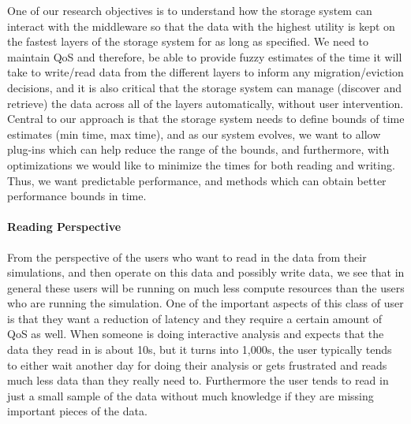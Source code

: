 One of our  research objectives is to understand how the
storage system can interact with the middleware   so
that the data with the highest utility is kept on the fastest layers of the
storage system for as long as specified. We need to maintain 
QoS and therefore, be able to provide fuzzy estimates of the time it will take to write/read data from
the different layers to inform any migration/eviction decisions, and it
is also critical that the storage system can manage (discover and retrieve) the data across all of the
layers automatically, without user intervention. 
Central to our approach is that the storage system needs to define bounds of time estimates
(min time, max time), and as our system evolves, we want to allow plug-ins which can help
reduce the range of the bounds, and furthermore, with optimizations we would like to minimize 
the times for both reading and writing. Thus, we want predictable performance, and methods
which can obtain better performance bounds in time.



\paragraph{Reading  Perspective}
\label{subsec:reading-perspective}
From the perspective of the users who want to read in the data from their
simulations, and then operate on this data and possibly write data, we see
that in general these users will be running on much less compute resources
than the users who are running the simulation. One of the important aspects
of this class of user is that they want a reduction of latency and they
require a certain amount of QoS as well. When someone is
doing interactive analysis and expects that the data they read in is about
10s, but it turns into 1,000s, the user typically tends to either wait
another day for doing their analysis or gets frustrated and reads much less
data than they really need to. Furthermore the user tends to read in just a
small sample of the data without much knowledge if they are missing
important pieces of the data.


